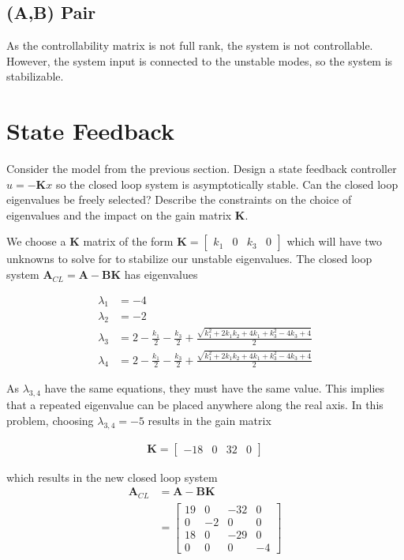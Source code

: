 \documentclass[]{article}
\begin{document}
\subsection{(A,B) Pair}
As the controllability matrix is not full rank, the system is not controllable.
However, the system input is connected to the unstable modes, so the system is stabilizable.

\section{State Feedback}

Consider the model from the previous section.
Design a state feedback controller $u = -\mathbf{K}x$ so the closed loop system is asymptotically stable.
Can the closed loop eigenvalues be freely selected?
Describe the constraints on the choice of eigenvalues and the impact on the gain matrix $\mathbf{K}$.

We choose a $\mathbf{K}$ matrix of the form $\mathbf{K} = \begin{bmatrix}
k_1 & 0 & k_3 & 0
\end{bmatrix}$ which will have two unknowns to solve for to stabilize our unstable eigenvalues.
The closed loop system $\mathbf{A}_{CL} = \mathbf{A} - \mathbf{BK}$ has eigenvalues

\begin{align*}
	\lambda_1 &= -4 \\
	\lambda_2 &= -2 \\
	\lambda_3 &= 2 - \frac{k_1}{2} - \frac{k_3}{2} + \frac{\sqrt{k_1^2 + 2k_1k_2 + 4k_1 + k_3^2 - 4k_3 + 4}}{2} \\
	\lambda_4 &= 2 - \frac{k_1}{2} - \frac{k_3}{2} + \frac{\sqrt{k_1^2 + 2k_1k_2 + 4k_1 + k_3^2 - 4k_3 + 4}}{2}
\end{align*}

As $\lambda_{3,4}$ have the same equations, they must have the same value.
This implies that a repeated eigenvalue can be placed anywhere along the real axis.
In this problem, choosing $\lambda_{3,4} = -5$ results in the gain matrix

\begin{align*}
	\mathbf{K} = \begin{bmatrix}
	-18 & 0 & 32 & 0
	\end{bmatrix}
\end{align*}

which results in the new closed loop system
\begin{align*}
	\mathbf{A}_{CL} &= \mathbf{A} - \mathbf{BK} \\
	&= \begin{bmatrix}
	19 & 0 & -32 & 0 \\
	0 & -2 & 0 & 0 \\
	18 & 0 & -29 & 0 \\
	0 & 0 & 0 & -4
	\end{bmatrix}
\end{align*}
\end{document}
